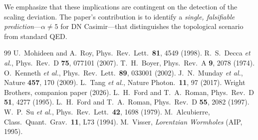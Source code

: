 \documentclass[aps,prl,twocolumn,superscriptaddress,nofootinbib]{revtex4-2}
\begin{document}
We emphasize that these implications are contingent on the
detection of the scaling deviation.  The paper's contribution is
to identify a \emph{single, falsifiable prediction}---$\alpha\neq 5$
for DN Casimir---that distinguishes the topological scenario from
standard QED.

\begin{thebibliography}{99}
 U.~Mohideen and A.~Roy, Phys.\ Rev.\ Lett.\ \textbf{81}, 4549 (1998).
 R.~S.~Decca \textit{et al.}, Phys.\ Rev.\ D \textbf{75}, 077101 (2007).
 T.~H.~Boyer, Phys.\ Rev.\ A \textbf{9}, 2078 (1974).
 O.~Kenneth \textit{et al.}, Phys.\ Rev.\ Lett.\ \textbf{89}, 033001 (2002).
 J.~N.~Munday \textit{et al.}, Nature \textbf{457}, 170 (2009).
 L.~Tang \textit{et al.}, Nature Photon.\ \textbf{11}, 97 (2017).
 Wright Brothers, companion paper (2026).
 L.~H.~Ford and T.~A.~Roman, Phys.\ Rev.\ D \textbf{51}, 4277 (1995).
 L.~H.~Ford and T.~A.~Roman, Phys.\ Rev.\ D \textbf{55}, 2082 (1997).
 W.~P.~Su \textit{et al.}, Phys.\ Rev.\ Lett.\ \textbf{42}, 1698 (1979).
 M.~Alcubierre, Class.\ Quant.\ Grav.\ \textbf{11}, L73 (1994).
 M.~Visser, \textit{Lorentzian Wormholes} (AIP, 1995).
\end{thebibliography}
\end{document}
